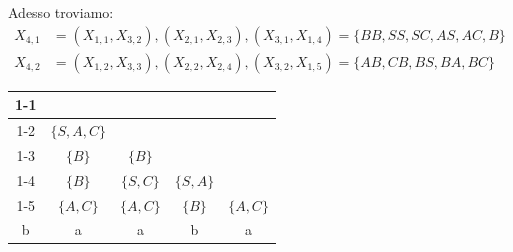 \documentclass[12pt]{report}
\begin{document}
\begin{example}{}{}
\begin{center}
\end{center}
Adesso troviamo:
\begin{align*}
	X_{4, 1} &= (X_{1,1}, X_{3, 2}), (X_{2, 1}, X_{2, 3}), (X_{3, 1}, X_{1, 4}) = \{BB, SS, SC, AS, AC, B\} \\
	X_{4, 2} &= (X_{1,2}, X_{3, 3}), (X_{2, 2}, X_{2, 4}), (X_{3, 2}, X_{1, 5}) = \{AB, CB, BS, BA, BC\}
\end{align*}
\begin{center}
\begin{tabular}{ccccc}
\cline{1-1}
\multicolumn{1}{|c|}{$\{S, A, C\}$} &  &  &  & \\ \cline{1-2}
\multicolumn{1}{|c|}{$\emptyset$} & \multicolumn{1}{c|}{$\{S, A, C\}$} &  &  & \\ \cline{1-3}
\multicolumn{1}{|c|}{$\emptyset$} & \multicolumn{1}{c|}{$\{B\}$} & \multicolumn{1}{c|}{$\{B\}$} &  & \\ \cline{1-4}
\multicolumn{1}{|c|}{$\{S, A\}$} & \multicolumn{1}{c|}{$\{B\}$} & \multicolumn{1}{c|}{$\{S, C\}$} & \multicolumn{1}{c|}{$\{S, A\}$} & \\ \cline{1-5}
\multicolumn{1}{|c|}{$\{B\}$} & \multicolumn{1}{c|}{$\{A, C\}$} & \multicolumn{1}{c|}{$\{A, C\}$} & \multicolumn{1}{c|}{$\{B\}$} & \multicolumn{1}{c|}{$\{A, C\}$} \\ \hline
\rule{0pt}{15pt} b & a & a & b & a
\end{tabular}
\end{center}

\end{example}
\end{document}
